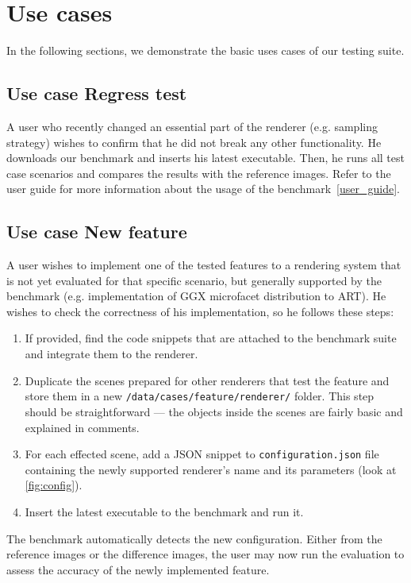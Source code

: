 \section{Use cases}

In the following sections, we demonstrate the basic uses cases of our testing suite.

\subsection{Use case Regress test}

A user who recently changed an essential part of the renderer (e.g. sampling strategy) wishes to confirm that he did not break any other functionality. He downloads our benchmark and inserts his latest executable. Then, he runs all test case scenarios and compares the results with the reference images. Refer to the user guide for more information about the usage of the benchmark~\ref{user_guide}.
 
\subsection{Use case New feature}
\label{sec:frodo}
A user wishes to implement one of the tested features to a rendering system that is not yet evaluated for that specific scenario, but generally supported by the benchmark (e.g. implementation of GGX microfacet distribution to ART). He wishes to check the correctness of his implementation, so he follows these steps:

\begin{enumerate}
	\item If provided, find the code snippets that are attached to the benchmark suite and integrate them to the renderer.
	\item Duplicate the scenes prepared for other renderers that test the feature and store them in a new \texttt{/data/cases/feature/renderer/} folder. This step should be straightforward --- the objects inside the scenes are fairly basic and explained in comments.
	\item For each effected scene, add a JSON snippet to \texttt{configuration.json} file containing the newly supported renderer's name and its parameters (look at \autoref{fig:config}).
	\item Insert the latest executable to the benchmark and run it.
\end{enumerate}

The benchmark automatically detects the new configuration. Either from the reference images or the difference images, the user may now run the evaluation to assess the accuracy of the newly implemented feature.

